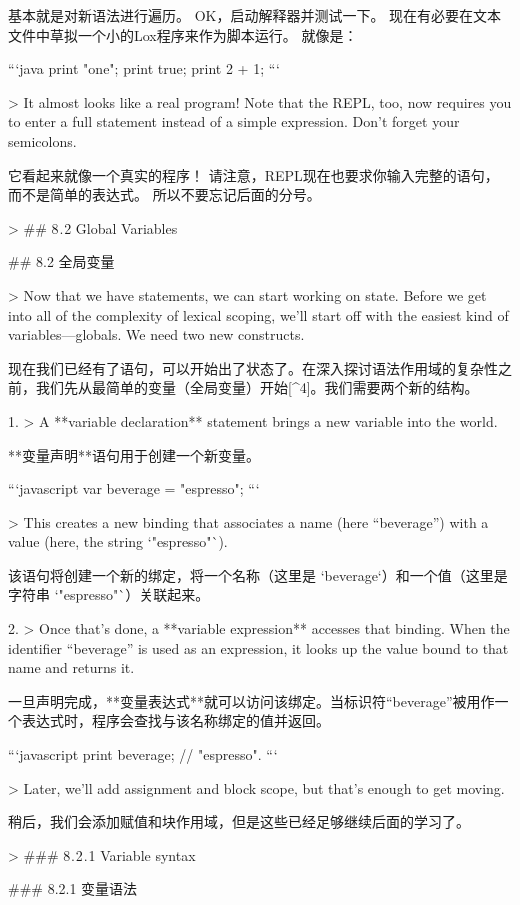 \documentclass[cn,11pt,chinese]{elegantbook}
\begin{document}
{{{基本就是对新语法进行遍历。 OK，启动解释器并测试一下。 现在有必要在文本文件中草拟一个小的Lox程序来作为脚本运行。 就像是：

```java
print "one";
print true;
print 2 + 1;
```

> It almost looks like a real program! Note that the REPL, too, now requires you to enter a full statement instead of a simple expression. Don’t forget your semicolons.

它看起来就像一个真实的程序！ 请注意，REPL现在也要求你输入完整的语句，而不是简单的表达式。 所以不要忘记后面的分号。

> ## 8 . 2 Global Variables

## 8.2 全局变量

> Now that we have statements, we can start working on state. Before we get into all of the complexity of lexical scoping, we’ll start off with the easiest kind of variables—globals. We need two new constructs.

现在我们已经有了语句，可以开始出了状态了。在深入探讨语法作用域的复杂性之前，我们先从最简单的变量（全局变量）开始[^4]。我们需要两个新的结构。

1. > A **variable declaration** statement brings a new variable into the world.
   
   **变量声明**语句用于创建一个新变量。
   
   ```javascript
   var beverage = "espresso";
   ```
   
   > This creates a new binding that associates a name (here “beverage”) with a value (here, the string `"espresso"`).
   
   该语句将创建一个新的绑定，将一个名称（这里是 `beverage`）和一个值（这里是字符串 `"espresso"`）关联起来。
   
2. > Once that’s done, a **variable expression** accesses that binding. When the identifier “beverage” is used as an expression, it looks up the value bound to that name and returns it.

   一旦声明完成，**变量表达式**就可以访问该绑定。当标识符“beverage”被用作一个表达式时，程序会查找与该名称绑定的值并返回。
   
   ```javascript
   print beverage; // "espresso".
   ```

> Later, we’ll add assignment and block scope, but that’s enough to get moving.

稍后，我们会添加赋值和块作用域，但是这些已经足够继续后面的学习了。

> ### 8 . 2 . 1 Variable syntax

### 8.2.1 变量语法

}}}
\end{document}
